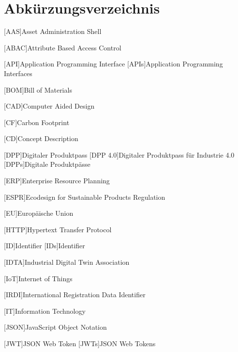 \section*{Abkürzungsverzeichnis}
{}
\vspace{0.6\baselineskip}
{

\begin{singlespacing}
\end{singlespacing}
\begin{acronym}[RAMI 4.0]

\setlength{\itemsep}{1\baselineskip}
\setlength{\parskip}{0pt}
\setlength{\parsep}{0pt}

[AAS]{Asset Administration Shell}

[ABAC]{Attribute Based Access Control}

[API]{Application Programming Interface}
[APIs]{Application Programming Interfaces}

[BOM]{Bill of Materials}

[CAD]{Computer Aided Design}

[CF]{Carbon Footprint}

[CD]{Concept Description}

[DPP]{Digitaler Produktpass}
[DPP 4.0]{Digitaler Produktpass für Industrie 4.0}
[DPPs]{Digitale Produktpässe}

[ERP]{Enterprise Resource Planning}

[ESPR]{Ecodesign for Sustainable Products Regulation}

[EU]{Europäische Union}

[HTTP]{Hypertext Transfer Protocol}

[ID]{Identifier}
[IDs]{Identifier}

[IDTA]{Industrial Digital Twin Association}

[IoT]{Internet of Things}

[IRDI]{International Registration Data Identifier}

[IT]{Information Technology}

[JSON]{JavaScript Object Notation}

[JWT]{JSON Web Token}
[JWTs]{JSON Web Tokens}


\end{acronym}}
